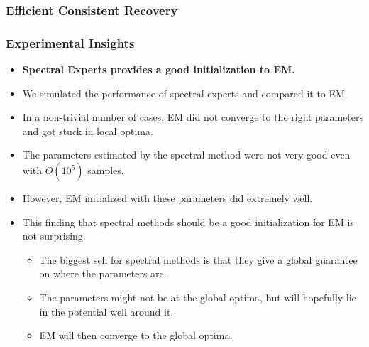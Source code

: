 \documentclass[xcolor={svgnames}]{beamer}
\begin{document}
\begin{frame}
  \frametitle{Efficient Consistent Recovery}

  \begin{centering}
  \end{centering}

\end{frame}

\begin{frame}
  \frametitle{Experimental Insights}
  \begin{itemize}
    \item {\bf Spectral Experts provides a good initialization to EM.}
      \item We simulated the performance of spectral experts and compared it to EM. 
\item In a non-trivial number of cases, EM did not converge to the right parameters and got stuck in local optima.
\item The parameters estimated by the spectral method were not very good even with $O(10^5)$ samples.
\item However, EM initialized with these parameters did extremely well. 
\item This finding that spectral methods should be a good initialization for EM is not surprising.
  \begin{itemize}
    \item The biggest sell for spectral methods is that they give a global guarantee on where the parameters are.
    \item The parameters might not be at the global optima, but will hopefully lie in the potential well around it.
    \item EM will then converge to the global optima.
  \end{itemize}
  \end{itemize}
\end{frame}
\end{document}
